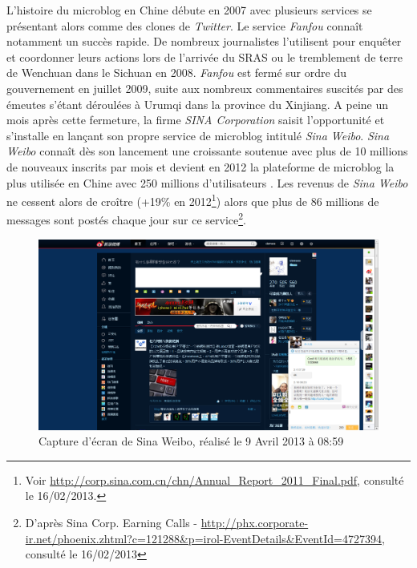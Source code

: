 L’histoire du microblog en Chine débute en 2007 avec plusieurs services se présentant alors comme des clones de \textit{Twitter}. Le service \textit{Fanfou} connaît notamment un succès rapide. De nombreux journalistes l’utilisent pour enquêter et coordonner leurs actions lors de l’arrivée du SRAS ou le tremblement de terre de Wenchuan dans le Sichuan en 2008. \textit{Fanfou} est fermé sur ordre du gouvernement en juillet 2009, suite aux nombreux commentaires suscités par des émeutes s’étant déroulées à Urumqi dans la province du Xinjiang. A peine un mois après cette fermeture, la firme \textit{SINA Corporation} saisit l’opportunité et s’installe en lançant son propre service de microblog intitulé \textit{Sina Weibo}. \textit{Sina Weibo} connaît dès son lancement une croissante soutenue avec plus de 10 millions de nouveaux inscrits par mois et devient en 2012 la plateforme de microblog la plus utilisée en Chine avec 250 millions d’utilisateurs \citep{McKinsey2012}. Les revenus de \textit{Sina Weibo} ne cessent alors de croître (+19\% en 2012\footnote{Voir \url{http://corp.sina.com.cn/chn/Annual_Report_2011_Final.pdf}, consulté le 16/02/2013.}) alors que plus de 86 millions de messages sont postés chaque jour sur ce service\footnote{D’après Sina Corp. Earning Calls - \url{http://phx.corporate-ir.net/phoenix.zhtml?c=121288&p=irol-EventDetails&EventId=4727394}, consulté le 16/02/2013}. 


\begin{figure}[htbp]
    \centering
    \includegraphics[scale=0.3]{figures/chap1/screenshot.png}
    \caption[Capture d’écran de Sina Weibo]{Capture d’écran de Sina Weibo, réalisé le 9 Avril 2013 à 08:59}
    \label{fig:screenshot_weibo}
\end{figure}

